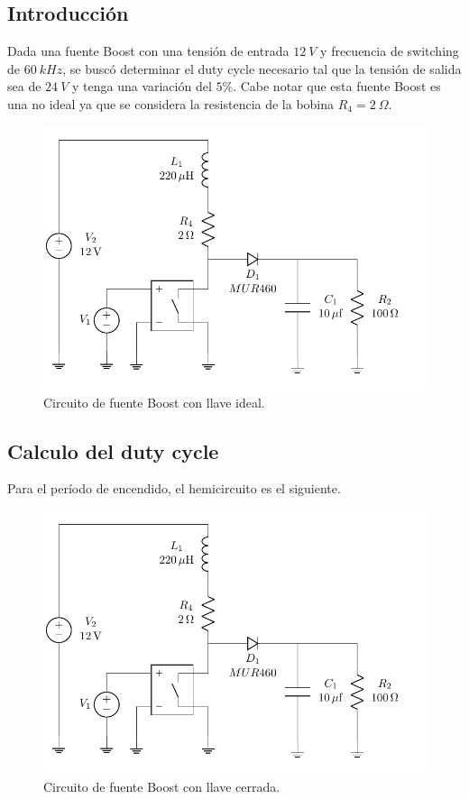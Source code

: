 %

%

\subsection{Introducción}

Dada una fuente Boost con una tensión de entrada $12 \ V$ y frecuencia de switching de $60 \ kHz$, se buscó determinar el duty cycle necesario tal que la tensión de salida sea de $24 \ V$ y tenga una variación del $5\%$. Cabe notar que esta fuente Boost es una no ideal ya que se considera la resistencia de la bobina $R_4 = 2 \ \Omega$.

\begin{figure}[H]
	\centering
	\includegraphics[width=0.5\linewidth, page=1]{ImagenesEjercicio-2/CircuitsEj2}
	\caption{Circuito de fuente Boost con llave ideal.}
	\label{fig:ej2:circuito}
\end{figure}

\subsection{Calculo del duty cycle}

Para el período de encendido, el hemicircuito es el siguiente. 

\begin{figure}[H]
	\centering
	\includegraphics[width=0.6\linewidth, page=2]{ImagenesEjercicio-2/CircuitsEj2}
	\caption{Circuito de fuente Boost con llave cerrada.}
	\label{fig:ej2:circuito_off}
\end{figure}

